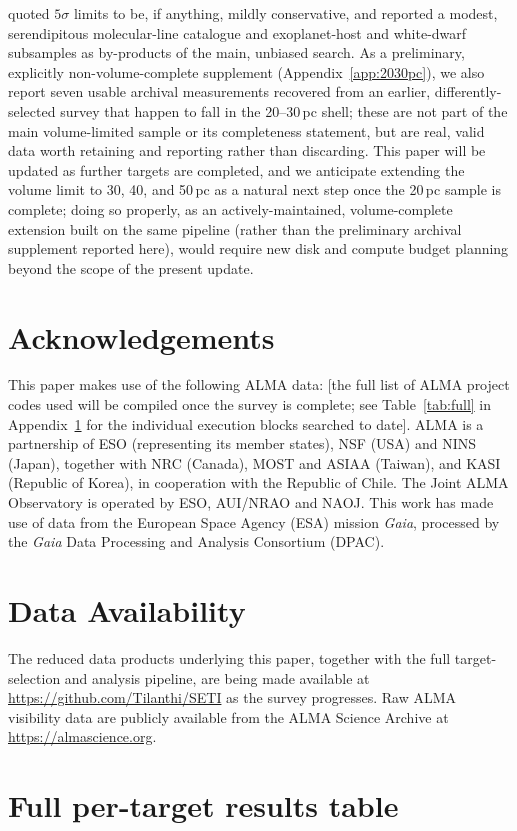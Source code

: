 \documentclass{openjournal}
\begin{document}
quoted $5\sigma$ limits to be, if anything, mildly conservative, and
reported a modest, serendipitous molecular-line catalogue and
exoplanet-host and white-dwarf subsamples as by-products of the main,
unbiased search. As a preliminary, explicitly non-volume-complete
supplement (Appendix~\ref{app:2030pc}), we also report seven usable
archival measurements recovered from an earlier, differently-selected
survey that happen to fall in the 20--30\,pc shell; these are not part of
the main volume-limited sample or its completeness statement, but are
real, valid data worth retaining and reporting rather than discarding.
This paper will be updated as further targets are
completed, and we anticipate extending the volume limit to 30, 40, and
50\,pc as a natural next step once the 20\,pc sample is complete; doing so
properly, as an actively-maintained, volume-complete extension built on
the same pipeline (rather than the preliminary archival supplement
reported here), would require new disk and compute budget planning
beyond the scope of the present update.

\section*{Acknowledgements}
This paper makes use of the following ALMA data: [the full list of ALMA
project codes used will be compiled once the survey is complete; see
Table~\ref{tab:full} in Appendix~\ref{app:table} for the individual
execution blocks searched to date]. ALMA is a partnership of ESO
(representing its member states), NSF (USA) and NINS (Japan), together with NRC
(Canada), MOST and ASIAA (Taiwan), and KASI (Republic of Korea), in cooperation
with the Republic of Chile. The Joint ALMA Observatory is operated by ESO,
AUI/NRAO and NAOJ. This work has made use of data from the European Space
Agency (ESA) mission {\it Gaia}, processed by the {\it Gaia} Data Processing and
Analysis Consortium (DPAC).

\section*{Data Availability}
The reduced data products underlying this paper, together with the full
target-selection and analysis pipeline, are being made available at
\url{https://github.com/Tilanthi/SETI} as the survey progresses. Raw ALMA
visibility data are publicly available from the ALMA Science Archive at
\url{https://almascience.org}.


\appendix
\section{Full per-target results table}
\label{app:table}
\end{document}
